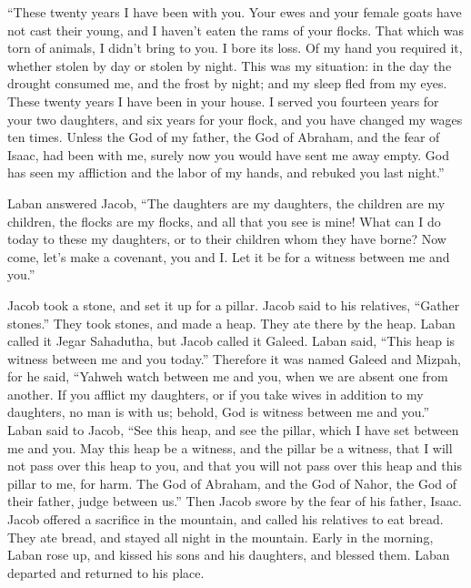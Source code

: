 {\par }{\PP {}“These twenty years I have been with you. Your ewes and your female goats have not cast their young, and I haven’t eaten the rams of your flocks.
That which was torn of animals, I didn’t bring to you. I bore its loss. Of my hand you required it, whether stolen by day or stolen by night.
This was my situation: in the day the drought consumed me, and the frost by night; and my sleep fled from my eyes.
These twenty years I have been in your house. I served you fourteen years for your two daughters, and six years for your flock, and you have changed my wages ten times.
Unless the God of my father, the God of Abraham, and the fear of Isaac, had been with me, surely now you would have sent me away empty. God has seen my affliction and the labor of my hands, and rebuked you last night.”
\par }{\PP {}Laban answered Jacob, “The daughters are my daughters, the children are my children, the flocks are my flocks, and all that you see is mine! What can I do today to these my daughters, or to their children whom they have borne?
Now come, let’s make a covenant, you and I. Let it be for a witness between me and you.”
\par }{\PP {}Jacob took a stone, and set it up for a pillar.
Jacob said to his relatives, “Gather stones.” They took stones, and made a heap. They ate there by the heap.
Laban called it Jegar Sahadutha, but Jacob called it Galeed.
Laban said, “This heap is witness between me and you today.” Therefore it was named Galeed
and Mizpah, for he said, “Yahweh watch between me and you, when we are absent one from another.
If you afflict my daughters, or if you take wives in addition to my daughters, no man is with us; behold, God is witness between me and you.”
Laban said to Jacob, “See this heap, and see the pillar, which I have set between me and you.
May this heap be a witness, and the pillar be a witness, that I will not pass over this heap to you, and that you will not pass over this heap and this pillar to me, for harm.
The God of Abraham, and the God of Nahor, the God of their father, judge between us.” Then Jacob swore by the fear of his father, Isaac.
Jacob offered a sacrifice in the mountain, and called his relatives to eat bread. They ate bread, and stayed all night in the mountain.
Early in the morning, Laban rose up, and kissed his sons and his daughters, and blessed them. Laban departed and returned to his place.

}
